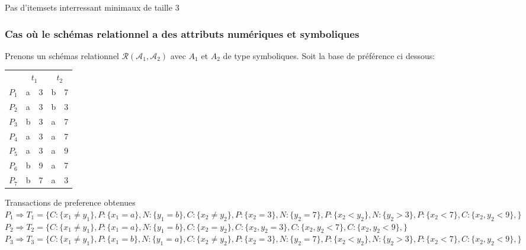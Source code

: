 \documentclass[11pt,a4paper]{article}
\theoremstyle{definition}
\begin{document}
       
       Pas d'itemsets interressant minimaux de taille 3\\
       
       
       
       \subsubsection{Cas où le schémas relationnel a des attributs numériques et symboliques}
       	Prenons un schémas relationnel $\mathcal{R}(\mathcal{A}_{1},\mathcal{A}_{2})$ avec $A_{1}$ et $A_{2}$ de type symboliques. Soit la base de préférence ci dessous:
       	\begin{center}
       	\begin{tabular}{l|l|l|l|l| } 
       	
       	&\multicolumn{2}{c|}{$t_{1}$} & \multicolumn{2}{c|}{$t_{2}$}\\
       	\cline{2-5}
       		$P_{1}$ & a & 3 & b & 7\\
       		$P_{2}$ & a & 3 & b & 3\\		
       		$P_{3}$ & b & 3 & a & 7\\
       		$P_{4}$ & a & 3 & a & 7\\
       		$P_{5}$ & a & 3 & a & 9\\
       		$P_{6}$ & b & 9 & a & 7\\
       		$P_{7}$ & b & 7 & a & 3\\
       	\cline{2-5}
       	\end{tabular}
       	\end{center}
       
       
       Transactions de preference obtenues\\
       
       \noindent $P_{1}\Rightarrow T_{1}=\{C:\{x_{1}\neq y_{1}\},P:\{x_{1}=a\},N:\{y_{1}=b\},C:\{x_{2}\neq y_{2}\},P:\{x_{2}=3\},N:\{y_{2}=7\},P:\{x_{2}<y_{2}\},N:\{y_{2}>3\},P:\{x_{2}<7\},C:\{x_{2},y_{2}<9\},\}$ \\
       
       \noindent $P_{2}\Rightarrow T_{2}=\{C:\{x_{1}\neq y_{1}\},P:\{x_{1}=a\},N:\{y_{1}=b\},C:\{x_{2}=y_{2}\},C:\{x_{2},y_{2}=3\},C:\{x_{2},y_{2}<7\},C:\{x_{2},y_{2}<9\},\}$ \\
       
       \noindent $P_{3}\Rightarrow T_{3}=\{C:\{x_{1}\neq y_{1}\},P:\{x_{1}=b\},N:\{y_{1}=a\},C:\{x_{2}\neq y_{2}\},P:\{x_{2}=3\},N:\{y_{2}=7\},P:\{x_{2}<y_{2}\},N:\{y_{2}>3\},P:\{x_{2}<7\},C:\{x_{2},y_{2}<9\},\}$ \\
       
\end{document}
